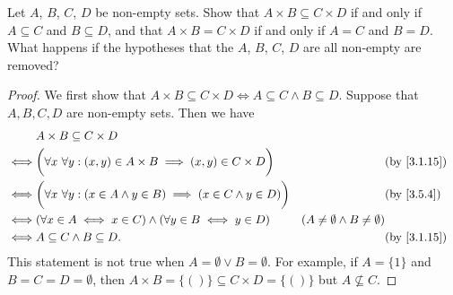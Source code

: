 \begin{ex}\label{ex:3.5.6}
  Let \(A\), \(B\), \(C\), \(D\) be non-empty sets.
  Show that \(A \times B \subseteq C \times D\) if and only if \(A \subseteq C\) and \(B \subseteq D\), and that \(A \times B = C \times D\) if and only if \(A = C\) and \(B = D\).
  What happens if the hypotheses that the \(A\), \(B\), \(C\), \(D\) are all non-empty are removed?
\end{ex}

\begin{proof}
  We first show that \(A \times B \subseteq C \times D \iff A \subseteq C \land B \subseteq D\).
  Suppose that \(A, B, C, D\) are non-empty sets.
  Then we have
  \begin{align*}
         & A \times B \subseteq C \times D                                                                                                                                     \\
    \iff & \bigg(\forall x \ \forall y : (x, y) \in A \times B \implies (x, y) \in C \times D\bigg)    &                                           & \text{(by \cref{3.1.15})} \\
    \iff & \bigg(\forall x \ \forall y :(x \in A \land y \in B) \implies (x \in C \land y \in D)\bigg) &                                           & \text{(by \cref{3.5.4})}  \\
    \iff & (\forall x \in A \iff x \in C) \land (\forall y \in B \iff y \in D)                         & (A \neq \emptyset \land B \neq \emptyset)                             \\
    \iff & A \subseteq C \land B \subseteq D.                                                          &                                           & \text{(by \cref{3.1.15})}
  \end{align*}
  This statement is not true when \(A = \emptyset \lor B = \emptyset\).
  For example, if \(A = \{1\}\) and \(B = C = D = \emptyset\), then \(A \times B = \{()\} \subseteq C \times D = \{()\}\) but \(A \not \subseteq C\).


\end{proof}
